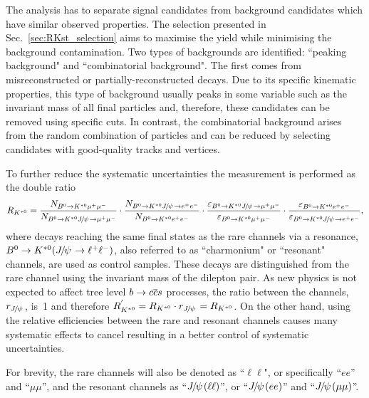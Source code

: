 The analysis has to separate signal candidates from background candidates which have similar observed properties. 
The selection presented in Sec.~\ref{sec:RKst_selection} aims to maximise the yield while minimising
the background contamination. Two types of backgrounds are identified: ``peaking background" and ``combinatorial background". 
The first comes from misreconstructed or partially-reconstructed  decays. Due to its specific kinematic properties, this type 
of background usually peaks in some variable such as the invariant
mass of all final particles and, therefore, these candidates can be removed using specific cuts. 
In contrast, the combinatorial background arises from the random combination of particles and can 
be reduced by selecting candidates with good-quality tracks and vertices.

To further reduce the systematic uncertainties the measurement is performed as the double ratio 
%
\begin{equation}
\label{eq:RKst}
R_{\Kstarz} = 
\frac{N_{\Bz\to\Kstarz \mumu}}{N_{\Bz\to\Kstarz\jpsi\to \mumu}} 
\cdot \frac{N_{\Bz\to\Kstarz \jpsi \to \ee}}{N_{\Bz\to\Kstarz\ee}}
\cdot \frac{\varepsilon_{\Bz\to\Kstarz \jpsi \to \mumu}}{\varepsilon_{\Bz\to\Kstarz \mumu}} 
\cdot \frac{\varepsilon_{\Bz\to\Kstarz \ee}}{\varepsilon_{\Bz\to\Kstarz\jpsi\to \ee}},
\end{equation}
%
where decays reaching the same final states as the rare channels via a \jpsi resonance, $\Bz\to\Kstarz(\jpsi\to\ll)$,
also referred to as ``charmonium" or ``resonant" channels, are used as control samples.
These decays are distinguished from the rare channel using the invariant mass of the dilepton pair.
%
%
As new physics is not expected to affect tree level $b\rightarrow{\ensuremath{c}}{\ensuremath{\overline {{c}}}}{\ensuremath{s}}$ processes, the ratio 
between the \jpsi channels, $r_{\jpsi}$, \mbox{is 1} and therefore \mbox{$\RKst^{'} = \RKst \cdot r_{\jpsi} = \RKst$}.
On the other hand, using the relative efficiencies between the rare and resonant channels
causes many systematic effects to cancel resulting in a better control of systematic uncertainties.  

For brevity, the rare channels will also be denoted as ``$\ell\ell$", or
specifically ``$ee$'' and ``$\mu\mu$'', and the resonant channels as ``$\jpsi(\ell\ell)$'',
or ``$\jpsi(ee)$'' and ``$\jpsi(\mu\mu)$''.


